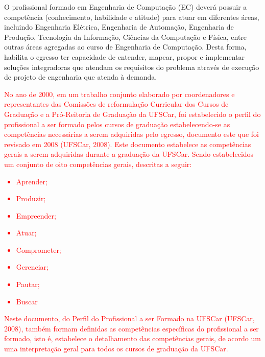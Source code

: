
O profissional formado em Engenharia de Computação (EC) deverá possuir a competência (conhecimento, habilidade e atitude) para atuar em diferentes áreas, incluindo Engenharia Elétrica, Engenharia de Automação, Engenharia de Produção, Tecnologia da Informação, Ciências da Computação e Física, entre outras áreas agregadas ao curso de Engenharia de Computação. Desta forma, habilita o egresso ter capacidade de entender, mapear, propor e implementar soluções integradoras que atendam os requisitos do problema através de execução de projeto de engenharia que atenda à demanda.



\textcolor{red}{No ano de 2000, em um trabalho conjunto elaborado por coordenadores e 
representantes das Comissões de reformulação
 Curricular dos Cursos de Graduação e a
Pró-Reitoria de Graduação da UFSCar, foi estabelecido o perfil do profissional a ser formado pelos cursos de graduação estabelecendo-se as competências necessárias a serem adquiridas pelo egresso, documento este que foi revisado em 2008 (UFSCar, 2008). Este documento estabelece as competências gerais a serem adquiridas durante a graduação da UFSCar. Sendo estabelecidos um conjunto de oito competências gerais, descritas a seguir:}
\textcolor{red}{\begin{itemize}
    \item Aprender;
    \item Produzir;
    \item Empreender;
    \item Atuar;
    \item Comprometer;
    \item Gerenciar;
    \item Pautar;
    \item Buscar
\end{itemize}}

\textcolor{red}{Neste documento, do Perfil do Profissional a ser Formado na UFSCar (UFSCar, 2008), também formam definidas as competências específicas do profissional a ser formado, isto é, estabelece o detalhamento das competências gerais, de acordo um uma interpretação geral para todos os cursos de graduação da UFSCar.}

